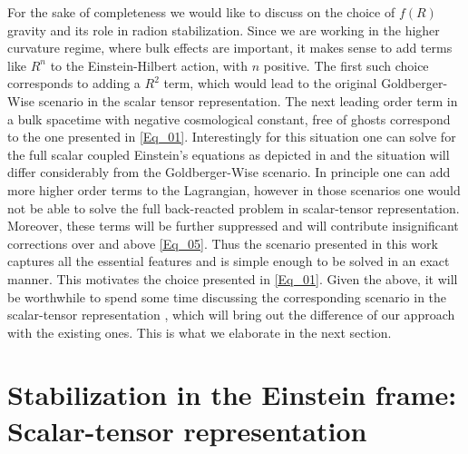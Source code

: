 \documentclass{article}
\def\EH{Einstein-Hilbert }
\begin{document}
For the sake of completeness we would like to discuss on the choice of $f(R)$ gravity and its role in radion stabilization. Since we are working in the higher curvature regime, where bulk effects are important, it makes sense to add terms like $R^{n}$ to the \EH action, with $n$ positive. The first such choice corresponds to adding a $R^{2}$ term, which would lead to the original Goldberger-Wise scenario in the scalar tensor representation. The next leading order term in a bulk spacetime with negative cosmological constant, free of ghosts correspond to the one presented in \ref{Eq_01}. Interestingly for this situation one can solve for the full scalar coupled Einstein's equations as depicted in \cite{Chakraborty:2016ydo} and the situation will differ considerably from the Goldberger-Wise scenario. In principle one can add more higher order terms to the Lagrangian, however in those scenarios one would not be able to solve the full back-reacted problem in scalar-tensor representation. Moreover, these terms will be further suppressed and will contribute insignificant corrections over and above \ref{Eq_05}. Thus the scenario presented in this work captures all the essential features and is simple enough to be solved in an exact manner. This motivates the choice presented in \ref{Eq_01}. Given the above, it will be worthwhile to spend some time discussing the corresponding scenario in the scalar-tensor representation \cite{Chakraborty:2016ydo}, which will bring out the difference of our approach with the existing ones. This is what we elaborate in the next section.
\section{Stabilization in the Einstein frame: Scalar-tensor representation}
\end{document}
